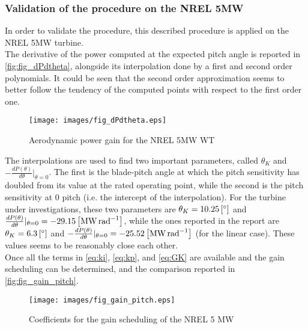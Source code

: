 \subsubsection{Validation of the procedure on the NREL 5MW}
In order to validate the procedure, this described procedure is applied on the NREL 5MW turbine.\\
The derivative of the power computed at the expected pitch angle is  reported in \autoref{fig:fig_dPdtheta}, alongside its interpolation done by a first and second order polynomials. It could be seen that the second order approximation seems to better follow the tendency of the computed points with respect to the first order one. 
\begin{figure}[htb]
    \centering
    \texttt{[image: images/fig\_dPdtheta.eps]}
    \caption{Aerodynamic power gain for the NREL 5MW WT}
    \label{fig:fig_dPdtheta}
\end{figure}

The interpolations are used to find two important parameters, called $\theta_{K}$ and  $-\frac{dP(\theta)}{d\theta}\vert_{\theta=0}$. The first is the blade-pitch angle at which the pitch sensitivity has doubled from its value at the rated operating point, while the second is the pitch sensitivity at 0 pitch (i.e. the intercept of the interpolation). For the turbine under investigations, these two parameters are $\theta_K=10.25 \left[\si{\degree}\right]$ and  $\frac{dP(\theta)}{d\theta}\vert_{\theta=0} = -29.15 \left[\si{\mega\watt\per\radian}\right]$, while the ones reported in the report are $\theta_K=6.3 \left[\si{\degree}\right]$ and  $-\frac{dP(\theta)}{d\theta}\vert_{\theta=0} = -25.52\left[\si{\mega\watt\per\radian}\right]$ (for the linear case). These values seems to be reasonably close each other.\\ 
Once all the terms in \autoref{eq:ki}, \ref{eq:kp}, and \ref{eq:GK} are available and the gain scheduling can be determined, and the comparison reported in \autoref{fig:fig_gain_pitch}.
\begin{figure}[htb]
    \centering
    \texttt{[image: images/fig\_gain\_pitch.eps]}
    \caption{Coefficients for the gain scheduling of the NREL 5 MW }
    \label{fig:fig_gain_pitch}
\end{figure}


